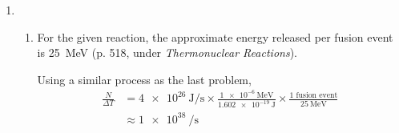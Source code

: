 \documentclass{homework}
\begin{document}
\begin{enumerate}
\begin{enumerate}
\begin{align*}
				r & = \left( \frac{3}{4\pi} V \right)^{1/3} \\
					& = \SI{2.35}{\centi\meter}
				\intertext{The sphere would have a radius of \SI{2.35}{\centi\meter}.}
			\end{align*}
		\end{enumerate}
		\item[30.] \begin{enumerate}
			\item For the given reaction, the approximate energy released per fusion event is \SI{25}{\MeV} (p. 518, under \textit{Thermonuclear Reactions}).
			
			 Using a similar process as the last problem, \begin{align*}
				 \frac{N}{\Delta T} & = \SI{4e26}{\J\per\s} \times \frac{\SI{1e-6}{\MeV}}{\SI{1.602e-19}{\J}} \times \frac{1 \text{ fusion event}}{\SI{25}{\MeV}} \\
				 	& \approx \SI{1e38}{\per\s}
			\end{align*}
			

\end{enumerate}
\end{enumerate}
\end{document}
